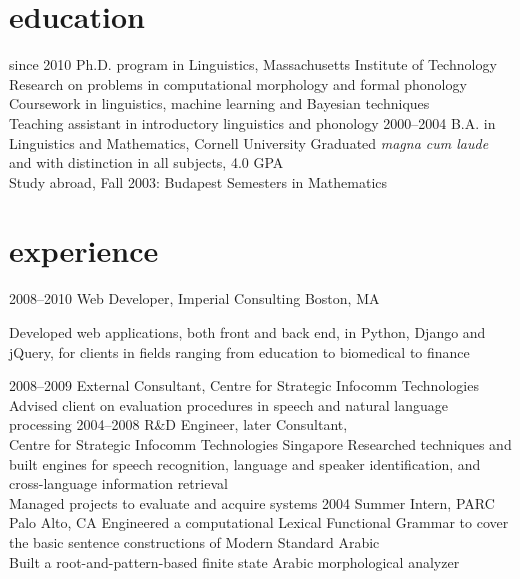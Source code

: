 \documentclass[]{friggeri-cv}
\begin{document}
\section{education}

\begin{entrylist}
  \entry
    {since 2010}
    {Ph.D. program in Linguistics, Massachusetts Institute of Technology}
    {}
    {%
     \Squaredot Research on problems in computational morphology and formal phonology \\
     \Squaredot Coursework in linguistics, machine learning and Bayesian techniques   \\
     \Squaredot Teaching assistant in introductory linguistics and phonology
    }
  \entry
    {2000--2004}
    {B.A. in Linguistics and Mathematics, Cornell University}
    {}
    {
    \Squaredot Graduated \emph{magna cum laude} and with distinction in all subjects, 4.0 GPA \\
	\Squaredot Study abroad, Fall 2003: Budapest Semesters in Mathematics}
\end{entrylist}

\section{experience}

\begin{entrylist}
  \entry
    {2008--2010}
    {Web Developer, Imperial Consulting}
    {Boston, MA}
    {
     \begin{hangparas}{.25in}{1}
     \Squaredot Developed web applications, both front and back end, in Python, Django and jQuery,
     for clients in fields ranging from education to biomedical to finance
     \end{hangparas}
    }
  \entry
    {2008--2009}
    {External Consultant, Centre for Strategic Infocomm Technologies}
    {}
    {\Squaredot Advised client on evaluation procedures in speech and natural language processing}
  \entry
    {2004--2008}
    {R\&D Engineer, later Consultant, \\ Centre for Strategic Infocomm Technologies}
    {Singapore}
    {\Squaredot Researched techniques and built engines for speech recognition, language and speaker identification, and cross-language information retrieval \\
    \Squaredot Managed projects to evaluate and acquire systems}
  \entry
    {2004}
    {Summer Intern, PARC}
    {Palo Alto, CA}
    {\Squaredot Engineered a computational Lexical Functional Grammar to cover the basic sentence constructions of Modern Standard Arabic \\
	\Squaredot Built a root-and-pattern-based finite state Arabic morphological analyzer}
\end{entrylist}
\end{document}
